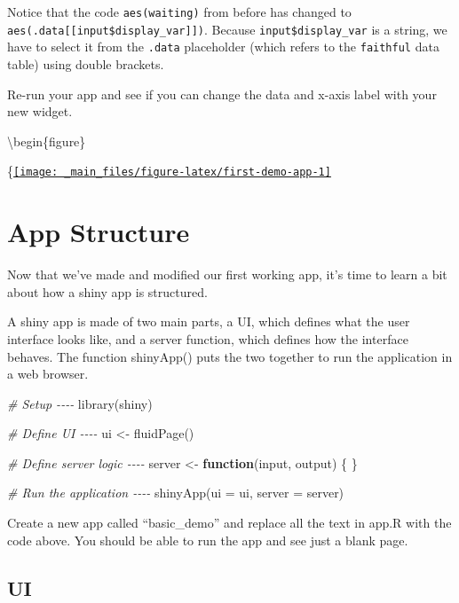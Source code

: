 \documentclass[
]{book}
\newenvironment{Shaded}{\begin{snugshade}}{\end{snugshade}}
\newcommand{\AttributeTok}[1]{\textcolor[rgb]{0.77,0.63,0.00}{#1}}
\newcommand{\CommentTok}[1]{\textcolor[rgb]{0.56,0.35,0.01}{\textit{#1}}}
\newcommand{\ControlFlowTok}[1]{\textcolor[rgb]{0.13,0.29,0.53}{\textbf{#1}}}
\newcommand{\FunctionTok}[1]{\textcolor[rgb]{0.00,0.00,0.00}{#1}}
\newcommand{\NormalTok}[1]{#1}
\newcommand{\OtherTok}[1]{\textcolor[rgb]{0.56,0.35,0.01}{#1}}
\begin{document}
Notice that the code \texttt{aes(waiting)} from before has changed to \texttt{aes(.data{[}{[}input\$display\_var{]}{]})}. Because \texttt{input\$display\_var} is a string, we have to select it from the \texttt{.data} placeholder (which refers to the \texttt{faithful} data table) using double brackets.

Re-run your app and see if you can change the data and x-axis label with your new widget.

\textbackslash begin\{figure\}

\{\centering \href{https://shiny.psy.gla.ac.uk/debruine/first_demo/}{\texttt{[image: \_main\_files/figure-latex/first-demo-app-1]} }

\hypertarget{app-structure}{%
\section{App Structure}\label{app-structure}}

Now that we've made and modified our first working app, it's time to learn a bit about how a shiny app is structured.

A shiny app is made of two main parts, a UI, which defines what the user interface looks like, and a server function, which defines how the interface behaves. The function shinyApp() puts the two together to run the application in a web browser.

\begin{Shaded}
\begin{Highlighting}[]
\CommentTok{\# Setup {-}{-}{-}{-}}
\FunctionTok{library}\NormalTok{(shiny)}

\CommentTok{\# Define UI {-}{-}{-}{-}}
\NormalTok{ui }\OtherTok{\textless{}{-}} \FunctionTok{fluidPage}\NormalTok{()}

\CommentTok{\# Define server logic {-}{-}{-}{-}}
\NormalTok{server }\OtherTok{\textless{}{-}} \ControlFlowTok{function}\NormalTok{(input, output) \{}
\NormalTok{\}}

\CommentTok{\# Run the application {-}{-}{-}{-}}
\FunctionTok{shinyApp}\NormalTok{(}\AttributeTok{ui =}\NormalTok{ ui, }\AttributeTok{server =}\NormalTok{ server)}
\end{Highlighting}
\end{Shaded}

Create a new app called ``basic\_demo'' and replace all the text in app.R with the code above. You should be able to run the app and see just a blank page.

\hypertarget{ui}{%
\subsection{UI}\label{ui}}
\end{document}
